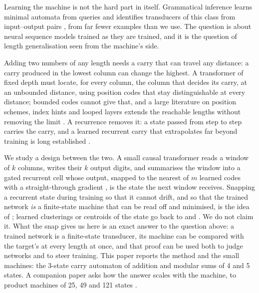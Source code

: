 \documentclass[11pt]{article}
\begin{document}
Learning the machine is not the hard part in itself. Grammatical inference learns minimal automata
from queries \citep{angluin-1987-learning-regular-sets-queries-counterexamples} and identifies
transducers of this class from input--output pairs
\citep{oncina-1992-transducer-learning-pattern-recognition}, from far fewer examples than we use.
The question is about neural sequence models trained as they are trained, and it is the question of
length generalisation seen from the machine's side.

Adding two numbers of any length needs a carry that can travel any distance: a carry produced in
the lowest column can change the highest. A transformer of fixed depth must locate, for every
column, the column that decides its carry, at an unbounded distance, using position codes that stay
distinguishable at every distance; bounded codes cannot give that, and a large literature on
position schemes, index hints and looped layers extends the reachable lengths without removing the
limit \citep{zhou-2024-length-generalization-not-robustly,mcleish-2024-abacus-embeddings,cho-2024-position-coupling,fan-2024-looped-transformers-length-generalization,kazemnejad-2023-positional-encoding-length-generalization,ruoss-2023-randomized-positional-encodings,liu-2022-transformers-shortcuts-automata}.
A recurrence removes it: a state passed from step to step carries the carry, and a learned
recurrent carry that extrapolates far beyond training is long established
\citep{kaiser-2015-neural-gpu,price-2016-neural-gpu-extensions-limitations,mohri-2026-rational-transductors,papazov-2025-exact-learning-arithmetic-differentiable-agents}.

We study a design between the two. A small causal transformer reads a window of $k$ columns,
writes their $k$ output digits, and summarises the window into a gated recurrent cell
\citep{cho-2014-rnn-encoder-decoder-gru} whose output, snapped to the nearest of $m$ learned codes
with a straight-through gradient \citep{van-den-oord-2017-vq-vae-neural-discrete-representation,bengio-2013-straight-through-estimator},
is the state the next window receives. Snapping a recurrent state during training so that it
cannot drift, and so that the trained network \emph{is} a finite-state machine that can be read off
and minimised, is the idea of \citet{zeng-1993-self-clustering-recurrent-networks}; learned
clusterings or centroids of the state go back to \citet{das-1993-unified-gradient-clustering-fsm-induction}
and \citet{wang-2019-state-regularized-rnns}. We do not claim it. What the snap gives us here is
an exact answer to the question above: a trained network is a finite-state transducer, its machine
can be compared with the target's at every length at once, and that proof can be used both to judge
networks and to steer training. This paper reports the method and the small machines: the 3-state
carry automaton of addition and modular sums of 4 and 5 states. A companion paper asks how the
answer scales with the machine, to product machines of 25, 49 and 121 states
\citep{barkhuizen-2026-certified-modular-division}.
\end{document}

